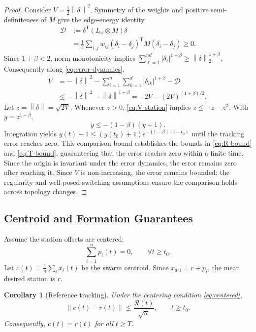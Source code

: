 \documentclass[letterpaper,10pt,conference]{ieeeconf}
\newcommand{\norm}[1]{\left\lVert #1 \right\rVert}
\newcommand{\abs}[1]{\left\lvert #1 \right\rvert}
\newcommand{\trans}{^{\mathsf T}}
\newtheorem{corollary}{Corollary}
\begin{document}
\begin{proof}
Consider $V=\frac12\norm{\delta}^2$. Symmetry of the weights and positive semi-definiteness of $M$ give the edge-energy identity
\begin{equation}
\begin{aligned}
  \mathcal D&:=\delta\trans(L_w\otimes M)\delta\\
   &=\frac12\sum_{i,j}w_{ij}(\delta_i-\delta_j)\trans M
      (\delta_i-\delta_j)\geq0.
\end{aligned}
\label{eq:edge-energy}
\end{equation}
Since $1+\beta<2$, norm monotonicity implies
$\sum_{\ell=1}^{nd}|\delta_\ell|^{1+\beta}\ge\norm{\delta}_2^{1+\beta}$.
Consequently along \eqref{eq:error-dynamics},
\begin{align}
  \dot V&=-\norm{\delta}^2-\sum_{i=1}^{n}\sum_{k=1}^{d}\abs{\delta_{ik}}^{1+\beta}-\mathcal D\\
  &\leq-\norm{\delta}^2-\norm{\delta}^{1+\beta}
   =-2V-(2V)^{(1+\beta)/2},
  \label{eq:V-station}
\end{align}
Let $z=\norm{\delta}=\sqrt{2V}$. Whenever $z>0$, \eqref{eq:V-station} implies $\dot z\leq-z-z^\beta$. With $y=z^{1-\beta}$,
\begin{equation}
  \dot y\leq-(1-\beta)(y+1).
\end{equation}
Integration yields $y(t)+1\leq(y(t_0)+1)e^{-(1-\beta)(t-t_0)}$ until the tracking error reaches zero. This comparison bound establishes the bounds in \eqref{eq:R-bound} and \eqref{eq:T-bound}, guaranteeing that the error reaches zero within a finite time. Since the origin is invariant under the error dynamics, the error remains zero after reaching it. Since $V$ is non-increasing, the error remains bounded; the regularity and well-posed switching assumptions ensure the comparison holds across topology changes.
\end{proof}

\subsection{Centroid and Formation Guarantees}
Assume the station offsets are centered:
\begin{equation}
  \sum_{i=1}^{n}p_i(t)=0,\qquad \forall t\geq t_0.
  \label{eq:centered}
\end{equation}
Let $c(t)=\frac1n\sum_i x_i(t)$ be the swarm centroid. Since $x_{d,i}=r+p_i$, the mean desired station is $r$.

\begin{corollary}[Reference tracking]
\label{cor:reference}
Under the centering condition \eqref{eq:centered},
\begin{equation}
    \norm{c(t)-r(t)}
    \leq \frac{\mathcal R(t)}{\sqrt n},
    \qquad t\geq t_0.
\end{equation}
Consequently, $c(t)=r(t)$ for all $t\geq T$.
\end{corollary}
\end{document}
